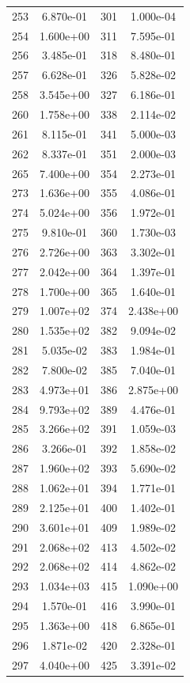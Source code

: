 \documentclass[12pt]{article}
\begin{document}
\begin{longtable}{@{}cccc@{}}
253 & 6.870e-01 & 301 & 1.000e-04 \\
254 & 1.600e+00 & 311 & 7.595e-01 \\
256 & 3.485e-01 & 318 & 8.480e-01 \\
257 & 6.628e-01 & 326 & 5.828e-02 \\
258 & 3.545e+00 & 327 & 6.186e-01 \\
260 & 1.758e+00 & 338 & 2.114e-02 \\
261 & 8.115e-01 & 341 & 5.000e-03 \\
262 & 8.337e-01 & 351 & 2.000e-03 \\
265 & 7.400e+00 & 354 & 2.273e-01 \\
273 & 1.636e+00 & 355 & 4.086e-01 \\
274 & 5.024e+00 & 356 & 1.972e-01 \\
275 & 9.810e-01 & 360 & 1.730e-03 \\
276 & 2.726e+00 & 363 & 3.302e-01 \\
277 & 2.042e+00 & 364 & 1.397e-01 \\
278 & 1.700e+00 & 365 & 1.640e-01 \\
279 & 1.007e+02 & 374 & 2.438e+00 \\
280 & 1.535e+02 & 382 & 9.094e-02 \\
281 & 5.035e-02 & 383 & 1.984e-01 \\
282 & 7.800e-02 & 385 & 7.040e-01 \\
283 & 4.973e+01 & 386 & 2.875e+00 \\
284 & 9.793e+02 & 389 & 4.476e-01 \\
285 & 3.266e+02 & 391 & 1.059e-03 \\
286 & 3.266e-01 & 392 & 1.858e-02 \\
287 & 1.960e+02 & 393 & 5.690e-02 \\
288 & 1.062e+01 & 394 & 1.771e-01 \\
289 & 2.125e+01 & 400 & 1.402e-01 \\
290 & 3.601e+01 & 409 & 1.989e-02 \\
291 & 2.068e+02 & 413 & 4.502e-02 \\
292 & 2.068e+02 & 414 & 4.862e-02 \\
293 & 1.034e+03 & 415 & 1.090e+00 \\
294 & 1.570e-01 & 416 & 3.990e-01 \\
295 & 1.363e+00 & 418 & 6.865e-01 \\
296 & 1.871e-02 & 420 & 2.328e-01 \\
297 & 4.040e+00 & 425 & 3.391e-02 \\

\end{longtable}
\end{document}
